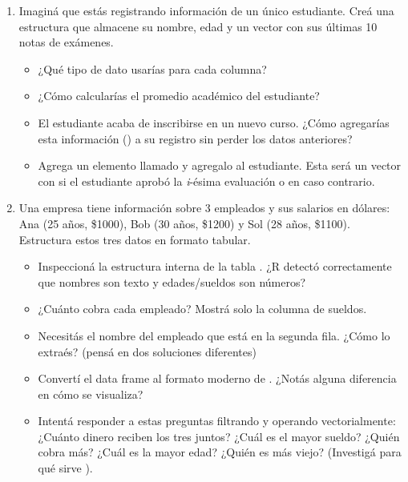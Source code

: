 \documentclass[8pt]{beamer}
\begin{document}
\begin{frame}[fragile]
	\begin{enumerate}[start=6]
		\item Imaginá que estás registrando información de un único estudiante. Creá una estructura que almacene su nombre, edad y un vector con sus últimas 10 notas de exámenes.
		\begin{itemize}
			\item ¿Qué tipo de dato usarías para cada columna?
			\item ¿Cómo calcularías el promedio académico del estudiante?
			\item El estudiante acaba de inscribirse en un nuevo curso. ¿Cómo agregarías esta información () a su registro sin perder los datos anteriores?
			\item Agrega un elemento llamado  y agregalo al estudiante. Esta será un vector con  si el estudiante aprobó la \textit{i}-ésima evaluación o  en caso contrario.
		\end{itemize}
		
		\item Una empresa tiene información sobre 3 empleados y sus salarios en dólares: Ana (25 años, \$1000), Bob (30 años, \$1200) y Sol (28 años, \$1100). Estructura estos tres datos en formato tabular.
		\begin{itemize}
			\item Inspeccioná la estructura interna de la tabla . ¿R detectó correctamente que nombres son texto y edades/sueldos son números?
			\item ¿Cuánto cobra cada empleado? Mostrá solo la columna de sueldos.
			\item Necesitás el nombre del empleado que está en la segunda fila. ¿Cómo lo extraés? (pensá en dos soluciones diferentes)
			\item Convertí el data frame  al formato moderno de . ¿Notás alguna diferencia en cómo se visualiza?
			\item Intentá responder a estas preguntas filtrando y operando vectorialmente: ¿Cuánto dinero reciben los tres juntos? ¿Cuál es el mayor sueldo? ¿Quién cobra más? ¿Cuál es la mayor edad? ¿Quién es más viejo? (Investigá para qué sirve ).
		\end{itemize}
	\end{enumerate}
\end{frame}
\end{document}
